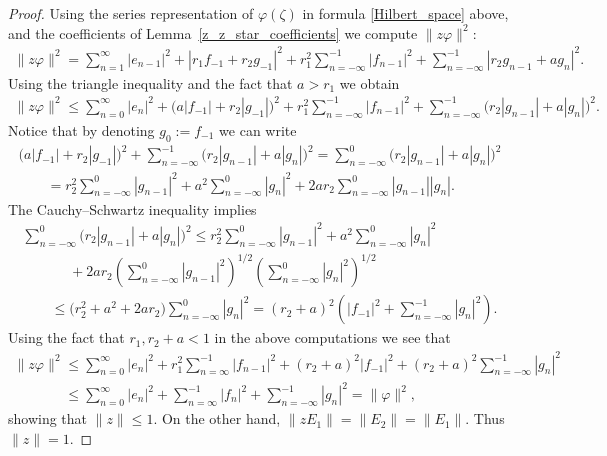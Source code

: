 \begin{proof}
Using the series representation of $\varphi(\zeta)$ in formula \eqref{Hilbert_space} above, and the coef\/f\/icients of
Lemma~\ref{z_z_star_coefficients} we compute $\|z\varphi\|^2$:
\begin{gather*}
\|z\varphi\|^2=\sum\limits_{n=1}^\infty |e_{n-1}|^2+|r_1f_{-1}+r_2g_{-1}|^2+r_1^2\sum\limits_{n=-\infty}^{-1}
|f_{n-1}|^2+\sum\limits_{n=-\infty}^{-1}|r_2g_{n-1}+ag_n|^2.
\end{gather*}
Using the triangle inequality and the fact that $a> r_1$ we obtain
\begin{gather*}
\|z\varphi\|^2 \le \sum\limits_{n=0}^\infty |e_n|^2+\big(a|f_{-1}|+r_2|g_{-1}|\big)^2+r_1^2
\sum\limits_{n=-\infty}^{-1}|f_{n-1}|^2+\sum\limits_{n=-\infty}^{-1}\big(r_2|g_{n-1}|+a|g_n|\big)^2.
\end{gather*}
Notice that by denoting $g_0:= f_{-1}$ we can write
\begin{gather*}
\big(a|f_{-1}|+r_2|g_{-1}|\big)^2+\sum\limits_{n=-\infty}^{-1}\big(r_2|g_{n-1}|+a|g_n|\big)^2=
\sum\limits_{n=-\infty}^{0}\big(r_2|g_{n-1}|+a|g_n|\big)^2
\\
\qquad{}
=r_2^2 \sum\limits_{n=-\infty}^0 |g_{n-1}|^2+ a^2\sum\limits_{n=-\infty}^0 |g_n|^2+2ar_2 \sum\limits_{n=-\infty}^0
|g_{n-1}||g_n|.
\end{gather*}
The Cauchy--Schwartz inequality implies
\begin{gather*}
\sum\limits_{n=-\infty}^{0}\big(r_2|g_{n-1}|+a|g_n|\big)^2   \leq r_2^2 \sum\limits_{n=-\infty}^0 |g_{n-1}|^2+
a^2\sum\limits_{n=-\infty}^0 |g_n|^2
\\
\qquad
\phantom{\leq}  {}
+2ar_2 \left(\sum\limits_{n=-\infty}^0 |g_{n-1}|^2\right)^{1/2}\left(\sum\limits_{n=-\infty}^0 |g_n|^2\right)^{1/2}
\\
\qquad
\leq \big(r_2^2+a^2+2ar_2\big) \sum\limits_{n=-\infty}^0 |g_n|^2 =(r_2+a)^2 \left(|f_{-1}|^2+\sum\limits_{n=-\infty}^{-1} |g_n|^2\right).
\end{gather*}
Using the fact that $r_1, r_2+a <1$ in the above computations we see that
\begin{gather*}
\|z\varphi\|^2  \le \sum\limits_{n=0}^\infty |e_n|^2+r_1^2\sum\limits_{n=\infty}^{-1}|f_{n-1}|^2+(r_2+a)^2
|f_{-1}|^2+(r_2+a)^2\sum\limits_{n=-\infty}^{-1}|g_n|^2
\\
\phantom{\|z\varphi\|^2}{}
 \leq \sum\limits_{n=0}^\infty |e_n|^2+\sum\limits_{n=\infty}^{-1}|f_n|^2+\sum\limits_{n=-\infty}^{-1}|g_n|^2 =
\|\varphi\|^2,
\end{gather*}
showing that $\|z\|\le 1$.
On the other hand, $\|zE_1\| =\| E_2\|=\|E_1\|$.
Thus $\|z\|=1$.
\end{proof}

